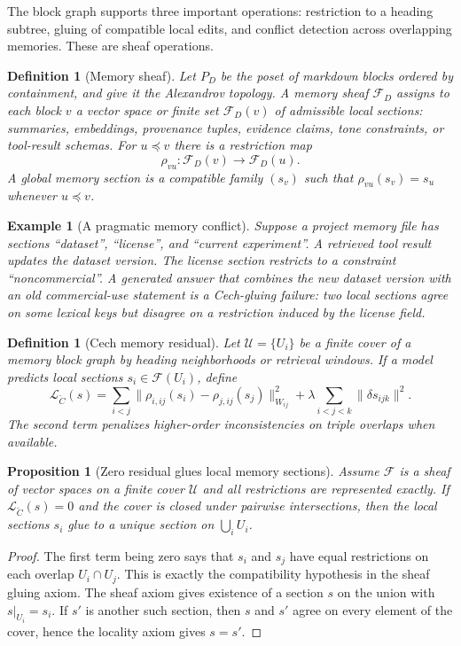 \documentclass[11pt]{article}
\newtheorem{proposition}[theorem]{Proposition}
\newtheorem{definition}[theorem]{Definition}
\newtheorem{example}[theorem]{Example}
\newcommand{\calF}{\mathcal{F}}
\newcommand{\calU}{\mathcal{U}}
\newcommand{\loss}{\mathcal{L}}
\numberwithin{equation}{section}
\begin{document}
The block graph supports three important operations: restriction to a heading subtree, gluing of compatible local edits, and conflict detection across overlapping memories. These are sheaf operations.

\begin{definition}[Memory sheaf]
Let $P_D$ be the poset of markdown blocks ordered by containment, and give it the Alexandrov topology. A memory sheaf $\calF_D$ assigns to each block $v$ a vector space or finite set $\calF_D(v)$ of admissible local sections: summaries, embeddings, provenance tuples, evidence claims, tone constraints, or tool-result schemas. For $u\preceq v$ there is a restriction map
\begin{equation}
 \rho_{vu}:\calF_D(v)\to \calF_D(u).
\end{equation}
A global memory section is a compatible family $(s_v)$ such that $\rho_{vu}(s_v)=s_u$ whenever $u\preceq v$.
\end{definition}

\begin{example}[A pragmatic memory conflict]
Suppose a project memory file has sections ``dataset'', ``license'', and ``current experiment''. A retrieved tool result updates the dataset version. The license section restricts to a constraint ``noncommercial''. A generated answer that combines the new dataset version with an old commercial-use statement is a Cech-gluing failure: two local sections agree on some lexical keys but disagree on a restriction induced by the license field.
\end{example}

\begin{definition}[Cech memory residual]
Let $\calU=\{U_i\}$ be a finite cover of a memory block graph by heading neighborhoods or retrieval windows. If a model predicts local sections $s_i\in\calF(U_i)$, define
\begin{equation}
\loss_{\check C}(s)=\sum_{i<j}\|\rho_{i,ij}(s_i)-\rho_{j,ij}(s_j)\|^2_{W_{ij}}
+\lambda\sum_{i<j<k}\|\delta s_{ijk}\|^2.
\end{equation}
The second term penalizes higher-order inconsistencies on triple overlaps when available.
\end{definition}

\begin{proposition}[Zero residual glues local memory sections]
Assume $\calF$ is a sheaf of vector spaces on a finite cover $\calU$ and all restrictions are represented exactly. If $\loss_{\check C}(s)=0$ and the cover is closed under pairwise intersections, then the local sections $s_i$ glue to a unique section on $\bigcup_i U_i$.
\end{proposition}
\begin{proof}
The first term being zero says that $s_i$ and $s_j$ have equal restrictions on each overlap $U_i\cap U_j$. This is exactly the compatibility hypothesis in the sheaf gluing axiom. The sheaf axiom gives existence of a section $s$ on the union with $s|_{U_i}=s_i$. If $s'$ is another such section, then $s$ and $s'$ agree on every element of the cover, hence the locality axiom gives $s=s'$.
\end{proof}
\end{document}
